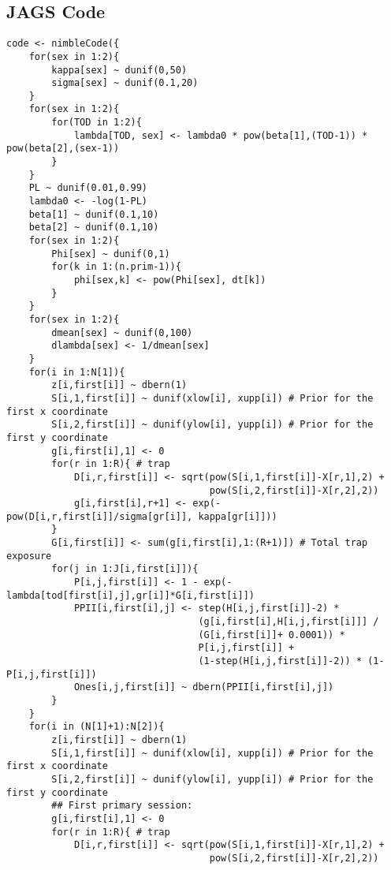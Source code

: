\subsection{JAGS Code} \label{appendix:voles_jags}

\begin{singlespace}
\begin{small}
\begin{verbatim}
code <- nimbleCode({
    for(sex in 1:2){
        kappa[sex] ~ dunif(0,50)
        sigma[sex] ~ dunif(0.1,20)
    }
    for(sex in 1:2){
        for(TOD in 1:2){
            lambda[TOD, sex] <- lambda0 * pow(beta[1],(TOD-1)) * pow(beta[2],(sex-1))
        }
    }
    PL ~ dunif(0.01,0.99)
    lambda0 <- -log(1-PL)
    beta[1] ~ dunif(0.1,10)
    beta[2] ~ dunif(0.1,10)
    for(sex in 1:2){
        Phi[sex] ~ dunif(0,1)
        for(k in 1:(n.prim-1)){
            phi[sex,k] <- pow(Phi[sex], dt[k])
        }
    }
    for(sex in 1:2){
        dmean[sex] ~ dunif(0,100)
        dlambda[sex] <- 1/dmean[sex]
    }
    for(i in 1:N[1]){
        z[i,first[i]] ~ dbern(1)
        S[i,1,first[i]] ~ dunif(xlow[i], xupp[i]) # Prior for the first x coordinate
        S[i,2,first[i]] ~ dunif(ylow[i], yupp[i]) # Prior for the first y coordinate
        g[i,first[i],1] <- 0
        for(r in 1:R){ # trap
            D[i,r,first[i]] <- sqrt(pow(S[i,1,first[i]]-X[r,1],2) + 
                                    pow(S[i,2,first[i]]-X[r,2],2))
            g[i,first[i],r+1] <- exp(-pow(D[i,r,first[i]]/sigma[gr[i]], kappa[gr[i]]))
        }
        G[i,first[i]] <- sum(g[i,first[i],1:(R+1)]) # Total trap exposure
        for(j in 1:J[i,first[i]]){
            P[i,j,first[i]] <- 1 - exp(-lambda[tod[first[i],j],gr[i]]*G[i,first[i]])
            PPII[i,first[i],j] <- step(H[i,j,first[i]]-2) * 
                                  (g[i,first[i],H[i,j,first[i]]] / 
                                  (G[i,first[i]]+ 0.0001)) * 
                                  P[i,j,first[i]] + 
                                  (1-step(H[i,j,first[i]]-2)) * (1-P[i,j,first[i]])
            Ones[i,j,first[i]] ~ dbern(PPII[i,first[i],j])
        }
    }
    for(i in (N[1]+1):N[2]){
        z[i,first[i]] ~ dbern(1)
        S[i,1,first[i]] ~ dunif(xlow[i], xupp[i]) # Prior for the first x coordinate
        S[i,2,first[i]] ~ dunif(ylow[i], yupp[i]) # Prior for the first y coordinate
        ## First primary session:
        g[i,first[i],1] <- 0
        for(r in 1:R){ # trap
            D[i,r,first[i]] <- sqrt(pow(S[i,1,first[i]]-X[r,1],2) + 
                                    pow(S[i,2,first[i]]-X[r,2],2))

\end{verbatim}
\end{small}
\end{singlespace}
